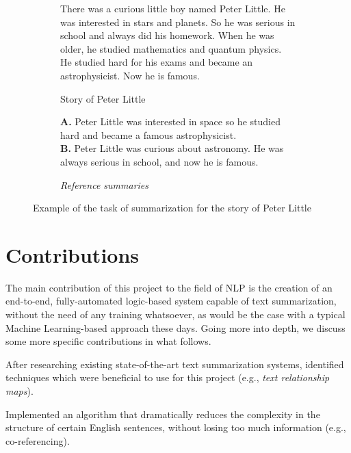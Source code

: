 \begin{figure}[H]
\begin{subfigure}{\textwidth}
\begin{displayquote}
There was a curious little boy named Peter Little. He was interested in stars and planets. So he was serious in school and always did his homework. When he was older, he studied mathematics and quantum physics. He studied hard for his exams and became an astrophysicist. Now he is famous.
\end{displayquote}
\caption{Story of Peter Little}
\vspace{\baselineskip}
\end{subfigure}
\begin{subfigure}{\textwidth}
\begin{displayquote}
\textbf{A.} Peter Little was interested in space so he studied hard and became a famous astrophysicist.\\
\textbf{B.} Peter Little was curious about astronomy. He was always serious in school, and now he is famous.
\end{displayquote}
\caption{\textit{Reference summaries}}
\end{subfigure}
\caption{Example of the task of summarization for the story of Peter Little}
\label{fig:peter_little}
\end{figure}

\section{Contributions}

The main contribution of this project to the field of NLP is the creation of an end-to-end, fully-automated logic-based system capable of text summarization, without the need of any training whatsoever, as would be the case with a typical Machine Learning-based approach these days. Going more into depth, we discuss some more specific contributions in what follows.

\begin{contribution}
After researching existing state-of-the-art text summarization systems, identified techniques which were beneficial to use for this project (e.g., \textit{text relationship maps}).
\end{contribution}

\begin{contribution}
Implemented an algorithm that dramatically reduces the complexity in the structure of certain English sentences, without losing too much information (e.g., co-referencing).
\end{contribution}


